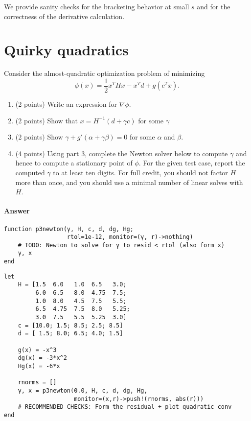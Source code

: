 \documentclass[12pt, leqno]{article} %
\providecommand{\tightlist}{%
  \setlength{\itemsep}{0pt}\setlength{\parskip}{0pt}}
\begin{document}
We provide sanity checks for the bracketing behavior at small \(s\) and
for the correctness of the derivative calculation.

\section{Quirky quadratics}

Consider the almost-quadratic optimization problem of minimizing
\[\phi(x) = \frac{1}{2} x^T H x - x^T d + g(c^T x).\]

\begin{enumerate}
\def\labelenumi{\arabic{enumi}.}
\tightlist
\item
  (2 points) Write an expression for \(\nabla \phi\).
\item
  (2 points) Show that \(x = H^{-1} (d + \gamma c)\) for some \(\gamma\)
\item
  (2 points) Show \(\gamma + g'(\alpha + \gamma \beta) = 0\) for some
  \(\alpha\) and \(\beta\).
\item
  (4 points) Using part 3, complete the Newton solver below to compute
  \(\gamma\) and hence to compute a stationary point of \(\phi\). For
  the given test case, report the computed \(\gamma\) to at least ten
  digits. For full credit, you should not factor \(H\) more than once,
  and you should use a minimal number of linear solves with \(H\).
\end{enumerate}

\paragraph{Answer}

\begin{verbatim}
function p3newton(γ, H, c, d, dg, Hg;
                  rtol=1e-12, monitor=(γ, r)->nothing)
    # TODO: Newton to solve for γ to resid < rtol (also form x)
    γ, x
end
\end{verbatim}

\begin{verbatim}
let
    H = [1.5  6.0   1.0  6.5   3.0;
         6.0  6.5   8.0  4.75  7.5;
         1.0  8.0   4.5  7.5   5.5;
         6.5  4.75  7.5  8.0   5.25;
         3.0  7.5   5.5  5.25  3.0]
    c = [10.0; 1.5; 8.5; 2.5; 8.5]
    d = [ 1.5; 8.0; 6.5; 4.0; 1.5]

    g(x) = -x^3
    dg(x) = -3*x^2
    Hg(x) = -6*x

    rnorms = []
    γ, x = p3newton(0.0, H, c, d, dg, Hg,
                    monitor=(x,r)->push!(rnorms, abs(r)))
    # RECOMMENDED CHECKS: Form the residual + plot quadratic conv
end
\end{verbatim}
\end{document}
